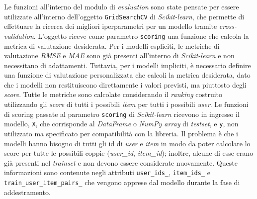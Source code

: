 Le funzioni all'interno del modulo di \textit{evaluation} sono state pensate per essere utilizzate all'interno dell'oggetto \texttt{GridSearchCV} di \textit{Scikit-learn}, che permette di effettuare la ricerca dei migliori iperparametri per un modello tramite \textit{cross-validation}. L'oggetto riceve come parametro \texttt{scoring} una funzione che calcola la metrica di valutazione desiderata. Per i modelli espliciti, le metriche di valutazione \textit{RMSE} e \textit{MAE} sono già presenti all'interno di \textit{Scikit-learn} e non necessitano di adattamenti. Tuttavia, per i modelli impliciti, è necessario definire una funzione di valutazione personalizzata che calcoli la metrica desiderata, dato che i modelli non restituiscono direttamente i valori previsti, ma piuttosto degli \textit{score}. Tutte le metriche sono calcolate considerando il \textit{ranking} costruito utilizzando gli \textit{score} di tutti i possibili \textit{item} per tutti i possibili \textit{user}. Le funzioni di scoring passate al parametro \texttt{scoring} di \textit{Scikit-learn} ricevono in ingresso il modello, \texttt{X}, che corrisponde al \textit{DataFrame} o \textit{NumPy array} di \textit{testset}, e \texttt{y}, non utilizzato ma specificato per compatibilità con la libreria. Il problema è che i modelli hanno bisogno di tutti gli id di \textit{user} e \textit{item} in modo da poter calcolare lo score per tutte le possibili coppie (\textit{user\_id}, \textit{item\_id}); inoltre, alcune di esse erano già presenti nel \textit{trainset} e non devono essere considerate nuovamente. Queste informazioni sono contenute negli attributi \texttt{user\_ids\_}, \texttt{item\_ids\_} e \texttt{train\_user\_item\_pairs\_} che vengono apprese dal modello durante la fase di addestramento.

